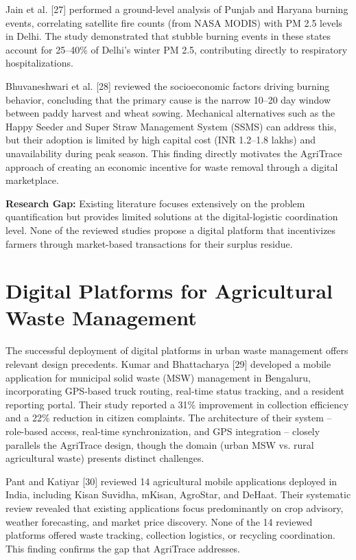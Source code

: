 \documentclass[a4paper,12pt,oneside]{report}
\begin{document}
Jain et al. [27] performed a ground-level analysis of Punjab and Haryana burning events, correlating satellite fire counts (from NASA MODIS) with PM 2.5 levels in Delhi. The study demonstrated that stubble burning events in these states account for 25--40\% of Delhi's winter PM 2.5, contributing directly to respiratory hospitalizations.

Bhuvaneshwari et al. [28] reviewed the socioeconomic factors driving burning behavior, concluding that the primary cause is the narrow 10--20 day window between paddy harvest and wheat sowing. Mechanical alternatives such as the Happy Seeder and Super Straw Management System (SSMS) can address this, but their adoption is limited by high capital cost (INR 1.2--1.8 lakhs) and unavailability during peak season. This finding directly motivates the AgriTrace approach of creating an economic incentive for waste removal through a digital marketplace.

\textbf{Research Gap:} Existing literature focuses extensively on the problem quantification but provides limited solutions at the digital-logistic coordination level. None of the reviewed studies propose a digital platform that incentivizes farmers through market-based transactions for their surplus residue.

\section{Digital Platforms for Agricultural Waste Management}

\noindent The successful deployment of digital platforms in urban waste management offers relevant design precedents. Kumar and Bhattacharya [29] developed a mobile application for municipal solid waste (MSW) management in Bengaluru, incorporating GPS-based truck routing, real-time status tracking, and a resident reporting portal. Their study reported a 31\% improvement in collection efficiency and a 22\% reduction in citizen complaints. The architecture of their system -- role-based access, real-time synchronization, and GPS integration -- closely parallels the AgriTrace design, though the domain (urban MSW vs. rural agricultural waste) presents distinct challenges.

Pant and Katiyar [30] reviewed 14 agricultural mobile applications deployed in India, including Kisan Suvidha, mKisan, AgroStar, and DeHaat. Their systematic review revealed that existing applications focus predominantly on crop advisory, weather forecasting, and market price discovery. None of the 14 reviewed platforms offered waste tracking, collection logistics, or recycling coordination. This finding confirms the gap that AgriTrace addresses.
\end{document}
